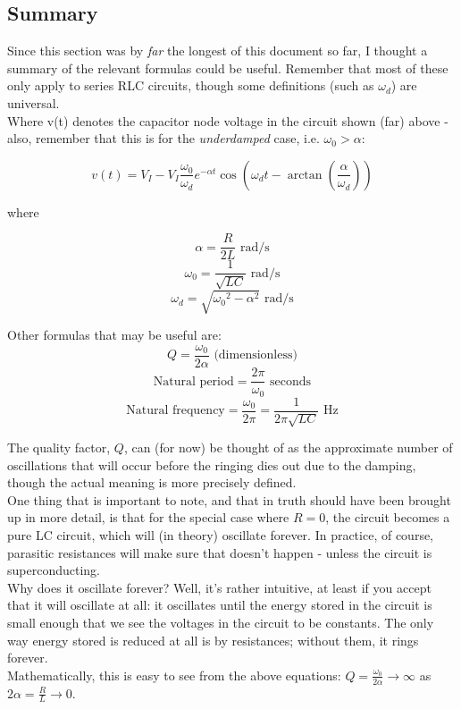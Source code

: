 \documentclass[12pt,a4paper]{report}
\begin{document}
\subsection{Summary}
Since this section was by \emph{far} the longest of this document so far, I thought a summary of the relevant formulas could be useful. Remember that most of these only apply to series RLC circuits, though some definitions (such as $\omega_d$) are universal.\\

Where v(t) denotes the capacitor node voltage in the circuit shown (far) above - also, remember that this is for the \emph{underdamped} case, i.e. $\displaystyle \omega_0 > \alpha$:

\[ v(t) = V_I - V_I \frac{\omega_0}{\omega_d} e^{-\alpha t} \cos{(\omega_d t - \arctan{(\frac{\alpha}{\omega_d})})} \]

where

\[ \alpha = \frac{R}{2L} \text{ rad/s}\]
\[ \omega_0 = \frac{1}{\sqrt{LC}} \text{ rad/s} \]
\[ \omega_d = \sqrt{{\omega_0}^2 - \alpha^2} \text{ rad/s} \]

Other formulas that may be useful are:
\[ Q = \frac{\omega_0}{2\alpha} \text{ (dimensionless)} \]
\[ \text{Natural period} = \frac{2\pi}{\omega_0} \text{ seconds} \]
\[ \text{Natural frequency} = \frac{\omega_0}{2\pi} = \frac{1}{2\pi \sqrt{LC}} \text{ Hz} \]

The quality factor, $Q$, can (for now) be thought of as the approximate number of oscillations that will occur before the ringing dies out due to the damping, though the actual meaning is more precisely defined.\\

One thing that is important to note, and that in truth should have been brought up in more detail, is that for the special case where $R = 0$, the circuit becomes a pure LC circuit, which will (in theory) oscillate forever. In practice, of course, parasitic resistances will make sure that doesn't happen - unless the circuit is superconducting.\\
Why does it oscillate forever? Well, it's rather intuitive, at least if you accept that it will oscillate at all: it oscillates until the energy stored in the circuit is small enough that we see the voltages in the circuit to be constants. The only way energy stored is reduced at all is by resistances; without them, it rings forever.\\

Mathematically, this is easy to see from the above equations: $\displaystyle Q = \frac{\omega_0}{2\alpha} \to \infty$ as $2\displaystyle \alpha = \frac{R}{L} \to 0$.
\end{document}
